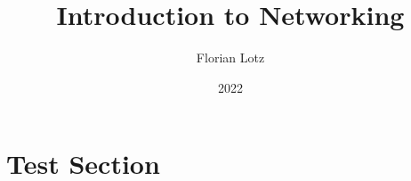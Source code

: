 \documentclass[11pt]{article}
\title{Introduction to Networking}
\author{Florian Lotz}
\date{2022}
\begin{document}
\maketitle

\tableofcontents

\section{Test Section}\label{sec:communication-fundamentals}
\end{document}
